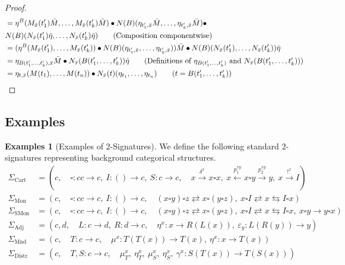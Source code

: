 \documentclass[11pt]{article}
\theoremstyle{plain}
\theoremstyle{definition}
\newtheorem{examples}[theorem]{Examples}
\numberwithin{equation}{section}
\begin{document}
\begin{proof}
{\begin{align*}
   &=\eta^B(M_{\bar{x}}(t_1')\bar{M},\ldots, M_{\bar{x}}(t_k')\bar{M})\bullet
   N(B)(\eta_{t_1',\bar{x}}\bar{M},\ldots, \eta_{t_k',\bar{x}}\bar{M})\bullet\\
   & N(B)(N_{\bar{x}}(t_1')\bar{\eta},\ldots, N_{\bar{x}}(t_k')\bar{\eta}) \tag{Composition componentwise}\\
   &= (\eta^B(M_{\bar{x}}(t_1'),\ldots, M_{\bar{x}}(t_k'))\bullet
   N(B)(\eta_{t_1',\bar{x}},\ldots, \eta_{t_k',\bar{x}}))\bar{M} \bullet
    N(B)(N_{\bar{x}}(t_1'),\ldots, N_{\bar{x}}(t_k'))\bar{\eta} \\
   &= \eta_{B(t_1',\ldots, t_k'),\bar{x}}\bar{M}\bullet N_{\bar{x}}(B(t_1',\ldots, t_k'))\bar{\eta}\tag{Definitions of $\eta_{B(t_1',\ldots, t_k')}$ and $N_{\bar{x}}(B(t_1',\ldots, t_k'))$}\\
   &=\eta_{t,\bar{x}}(M(t_1),\ldots, M(t_n))\bullet N_{\bar{x}}(t)(\eta_{t_1},\ldots, \eta_{t_n})\tag{$t = B(t_1',\ldots, t_k')$}
\end{align*}
}
\end{proof}

\subsection{Examples}

\begin{examples}[Examples of $2$-Signatures]\label{ex:$2$-signatures}
   We define the following standard $2$-signatures representing background categorical structures. 
   {\small
   \begin{align*}
       \Sigma_{\text{Cart}}    
    &= (c,\quad \square\colon cc\to c,\ I\colon ()\to c,\ S\colon c\to c,
    \quad x\xrightarrow{\delta^x}x\square x, \ x\xleftarrow{p_1^{xy}}x\square y\xrightarrow{p_2^{xy}}y,\ x\xrightarrow{!^x}I)\\
       \Sigma_{\text{Mon}}     
       &= (c,\quad \square\colon cc\to c,\  I\colon ()\to c,\quad (x\square y)\square z\rightleftarrows x\square (y\square z),\ x\square I\rightleftarrows x\leftrightarrows I\square x)\\
       \Sigma_{\text{SMon}}
       &= (c,\quad \square\colon cc\to c,\ I\colon ()\to c,\quad (x\square y)\square z\rightleftarrows x\square (y\square z),\  x\square I\rightleftarrows x\leftrightarrows I\square x,\ x\square y\to y\square x)\\
       \Sigma_{\text{Adj}}
       &= (c,d,\quad L\colon c\to d,\ R\colon d\to c,\quad \eta^x\colon x\to R(L(x)),\ \varepsilon_y\colon L(R(y))\to y)\\
       \Sigma_{\text{Mnd}}
       &= (c,\quad T\colon c\to c,\quad \mu^x\colon T(T(x))\to T(x),\ \eta^x\colon x\to T(x))\\
       \Sigma_{\text{Distr}}
       &= (c,\quad T,S\colon c\to c,\quad  \mu_T^x,\ \eta_T^x,\ \mu_S^x,\ \eta_S^x,\ \gamma^x\colon S(T(x))\to T(S(x))) 
   \end{align*}
   }
\end{examples}
\end{document}
